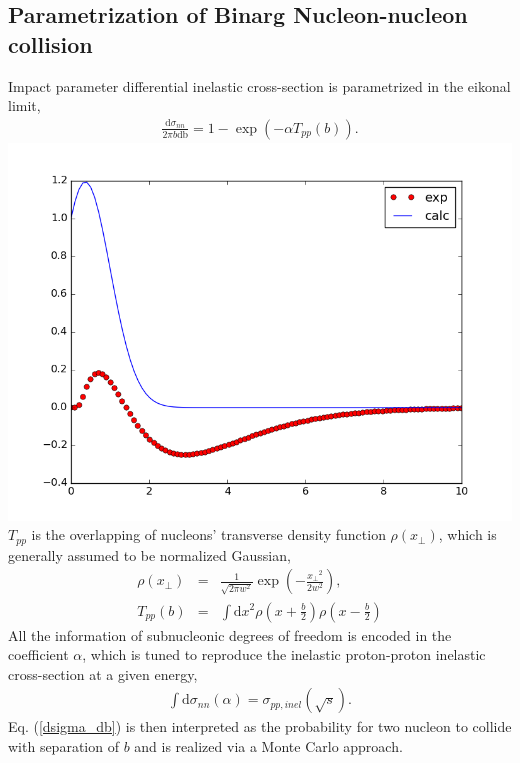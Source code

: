 \documentclass[aps,prl,twocolumn,groupedaddress]{revtex4-1}
\begin{document}
	\subsection{Parametrization of Binarg Nucleon-nucleon collision}
	Impact parameter differential inelastic cross-section is parametrized in the eikonal limit,
	\begin{eqnarray}\label{dsigma_db}
		\frac{\mathrm{d}\sigma_{nn}}{2\pi b \mathrm{db}} = 1 - \exp\left(-\alpha T_{pp} (b)\right).
	\end{eqnarray}
	\includegraphics[width=\columnwidth]{pics/place_holder.png}
	$T_{pp}$ is the overlapping of nucleons' transverse density function $\rho(x_\perp)$, which is generally assumed to be normalized Gaussian,
	\begin{eqnarray}
		\rho(x_\perp) &=& \frac{1}{\sqrt{2\pi w^2}}\exp\left(-\frac{{x_\perp}^2}{2w^2}\right), \\
		T_{pp}(b) &=& \int \mathrm{d}{x}^2 \rho(x+\frac{b}{2})\rho(x-\frac{b}{2})
	\end{eqnarray}
	All the information of subnucleonic degrees of freedom is encoded in the coefficient $\alpha$, which is tuned to reproduce the inelastic proton-proton inelastic cross-section at a given energy,
	\begin{eqnarray}
		\int \mathrm{d}\sigma_{nn}(\alpha) = \sigma_{pp, inel}(\sqrt{s}).
	\end{eqnarray}
	Eq. (\ref{dsigma_db}) is then interpreted as the probability for two nucleon to collide with separation of $b$ and is realized via a Monte Carlo approach.
\end{document}
